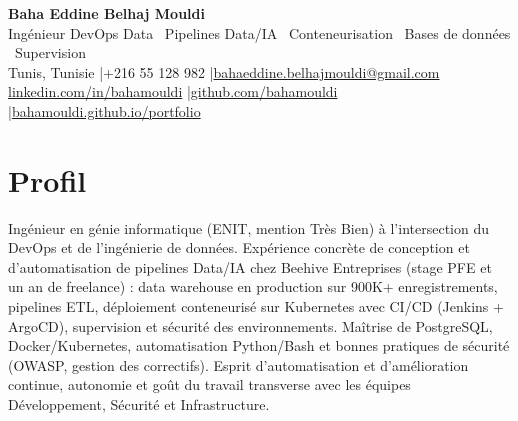 \documentclass[a4paper,9pt]{article}
\begin{document}
\begin{center}
{\LARGE\bfseries\color{navy} Baha Eddine Belhaj Mouldi}\\[2pt]
{\normalsize\color{navy} Ingénieur DevOps Data \textbar\ Pipelines Data/IA \textbar\ Conteneurisation \textbar\ Bases de données \textbar\ Supervision}\\[3pt]
{\small Tunis, Tunisie \quad|\quad +216 55 128 982 \quad|\quad \href{mailto:bahaeddine.belhajmouldi@gmail.com}{bahaeddine.belhajmouldi@gmail.com}}\\[1pt]
{\small \href{https://www.linkedin.com/in/bahamouldi}{linkedin.com/in/bahamouldi} \quad|\quad \href{https://github.com/bahamouldi}{github.com/bahamouldi} \quad|\quad \href{https://bahamouldi.github.io/portfolio/}{bahamouldi.github.io/portfolio}}
\end{center}
\vspace{1pt}
\section{Profil}
Ingénieur en génie informatique (ENIT, mention Très Bien) à l'intersection du DevOps et de l'ingénierie de données. Expérience concrète de conception et d'automatisation de pipelines Data/IA chez Beehive Entreprises (stage PFE et un an de freelance) : data warehouse en production sur 900K+ enregistrements, pipelines ETL, déploiement conteneurisé sur Kubernetes avec CI/CD (Jenkins + ArgoCD), supervision et sécurité des environnements. Maîtrise de PostgreSQL, Docker/Kubernetes, automatisation Python/Bash et bonnes pratiques de sécurité (OWASP, gestion des correctifs). Esprit d'automatisation et d'amélioration continue, autonomie et goût du travail transverse avec les équipes Développement, Sécurité et Infrastructure.
\end{document}
